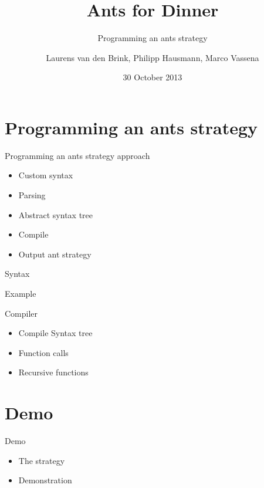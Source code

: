 \documentclass{beamer}
\title{Ants for Dinner}
\subtitle{Programming an ants strategy}
\author{Laurens van den Brink, Philipp Hausmann, Marco Vassena}
\date{30 October 2013}
\begin{document}
\begin{frame}
  \titlepage
\end{frame}


\section{Programming an ants strategy}
\begin{frame}{Programming an ants strategy approach}
	\begin{itemize}
		\item Custom syntax
		\item Parsing
		\item Abstract syntax tree
		\item Compile
		\item Output ant strategy
	\end{itemize}
\end{frame}

\begin{frame}[fragile]{Syntax}
	\begin{block}{Example}
	\end{block}
\end{frame}

\begin{frame}{Compiler}
	\begin{itemize}
		\item Compile Syntax tree
		\item Function calls
		\item Recursive functions
	\end{itemize}
\end{frame}

\section{Demo}

\begin{frame}{Demo}
	\begin{itemize}
		\item The strategy
		\item Demonstration
	\end{itemize}
\end{frame}
\end{document}
